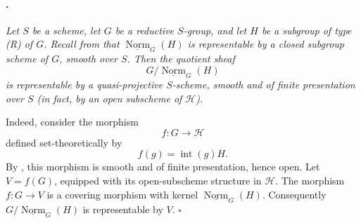 \paragraph{.}
\textit{Let \(S\) be a scheme, let \(G\) be a reductive
\(S\)-group, and let \(H\) be a subgroup of type \textup{(R)} of
\(G\). Recall from  that
\(\underline{\operatorname{Norm}}_G(H)\) is representable by a
closed subgroup scheme of \(G\), smooth over \(S\). Then the
quotient sheaf
\[
  G/\underline{\operatorname{Norm}}_G(H)
\]
is representable by a quasi-projective \(S\)-scheme, smooth and of
finite presentation over \(S\) \textup{(in fact, by an open
subscheme of \(\mathcal H\))}.}

Indeed, consider the morphism
\[
  f\colon G\longrightarrow\mathcal H
\]
defined set-theoretically by
\[
  f(g)=\operatorname{int}(g)H.
\]
By , this morphism is smooth and of finite presentation, hence
open. Let \(V=f(G)\), equipped with its open-subscheme structure in
\(\mathcal H\). The morphism \(f\colon G\to V\) is a covering
morphism with kernel \(\underline{\operatorname{Norm}}_G(H)\).
Consequently
\(G/\underline{\operatorname{Norm}}_G(H)\) is representable by
\(V\).
\hfill\(\square\)

